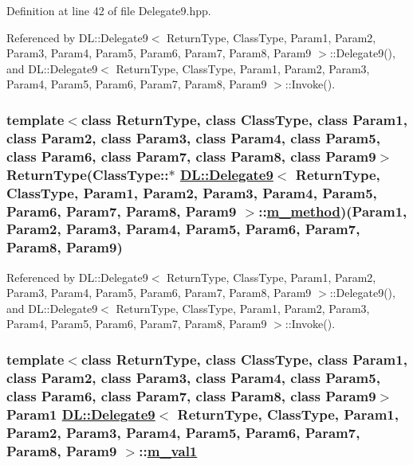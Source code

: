 Definition at line 42 of file Delegate9.hpp.

Referenced by DL::Delegate9$<$ Return\-Type, Class\-Type, Param1, Param2, Param3, Param4, Param5, Param6, Param7, Param8, Param9 $>$::Delegate9(), and DL::Delegate9$<$ Return\-Type, Class\-Type, Param1, Param2, Param3, Param4, Param5, Param6, Param7, Param8, Param9 $>$::Invoke().\hypertarget{classDL_1_1Delegate9_r1}{
\subsubsection[m\_\-method]{\setlength{\rightskip}{0pt plus 5cm}template$<$class Return\-Type, class Class\-Type, class Param1, class Param2, class Param3, class Param4, class Param5, class Param6, class Param7, class Param8, class Param9$>$ Return\-Type(Class\-Type::$\ast$ \hyperlink{classDL_1_1Delegate9}{DL::Delegate9}$<$ Return\-Type, Class\-Type, Param1, Param2, Param3, Param4, Param5, Param6, Param7, Param8, Param9 $>$::\hyperlink{classDL_1_1Delegate9_r1}{m\_\-method})(Param1, Param2, Param3, Param4, Param5, Param6, Param7, Param8, Param9)}}
\label{classDL_1_1Delegate9_r1}




Referenced by DL::Delegate9$<$ Return\-Type, Class\-Type, Param1, Param2, Param3, Param4, Param5, Param6, Param7, Param8, Param9 $>$::Delegate9(), and DL::Delegate9$<$ Return\-Type, Class\-Type, Param1, Param2, Param3, Param4, Param5, Param6, Param7, Param8, Param9 $>$::Invoke().\hypertarget{classDL_1_1Delegate9_r2}{
\subsubsection[m\_\-val1]{\setlength{\rightskip}{0pt plus 5cm}template$<$class Return\-Type, class Class\-Type, class Param1, class Param2, class Param3, class Param4, class Param5, class Param6, class Param7, class Param8, class Param9$>$ Param1 \hyperlink{classDL_1_1Delegate9}{DL::Delegate9}$<$ Return\-Type, Class\-Type, Param1, Param2, Param3, Param4, Param5, Param6, Param7, Param8, Param9 $>$::\hyperlink{classDL_1_1Delegate9_r2}{m\_\-val1}}}
\label{classDL_1_1Delegate9_r2}




